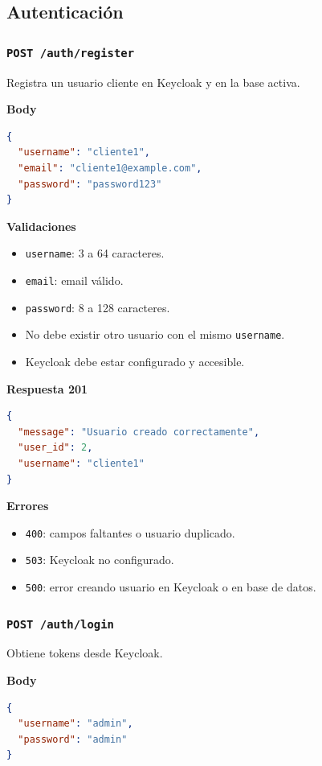 \documentclass[12pt,letterpaper]{article}
\def\endpoint#1#2{\texttt{#1 #2}}
\def\codefile#1{\nolinkurl{#1}}
\begin{document}
\subsection{Autenticación}

\subsubsection{\endpoint{POST}{/auth/register}}

Registra un usuario cliente en Keycloak y en la base activa.

\textbf{Body}
\begin{lstlisting}[language=json]
{
  "username": "cliente1",
  "email": "cliente1@example.com",
  "password": "password123"
}
\end{lstlisting}

\textbf{Validaciones}
\begin{itemize}
    \item \codefile{username}: 3 a 64 caracteres.
    \item \codefile{email}: email válido.
    \item \codefile{password}: 8 a 128 caracteres.
    \item No debe existir otro usuario con el mismo \codefile{username}.
    \item Keycloak debe estar configurado y accesible.
\end{itemize}

\textbf{Respuesta 201}
\begin{lstlisting}[language=json]
{
  "message": "Usuario creado correctamente",
  "user_id": 2,
  "username": "cliente1"
}
\end{lstlisting}

\textbf{Errores}
\begin{itemize}
    \item \codefile{400}: campos faltantes o usuario duplicado.
    \item \codefile{503}: Keycloak no configurado.
    \item \codefile{500}: error creando usuario en Keycloak o en base de datos.
\end{itemize}

\subsubsection{\endpoint{POST}{/auth/login}}

Obtiene tokens desde Keycloak.

\textbf{Body}
\begin{lstlisting}[language=json]
{
  "username": "admin",
  "password": "admin"
}
\end{lstlisting}
\end{document}
